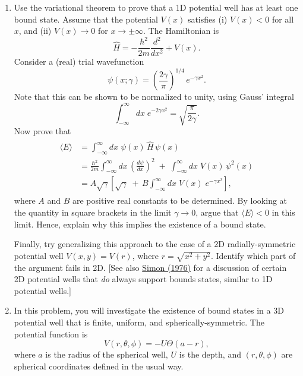 \documentclass[pra,12pt]{revtex4}
\begin{document}
\begin{enumerate}
\item Use the variational theorem to prove that a 1D potential well
  has at least one bound state.  Assume that the potential $V(x)$
  satisfies (i) $V(x) < 0$ for all $x$, and (ii) $V(x)\rightarrow 0$
  for $x\rightarrow\pm\infty$.  The Hamiltonian is
  \begin{equation}
    \hat{H} = - \frac{\hbar^2}{2m} \frac{d^2}{dx^2} + V(x).
  \end{equation}
  Consider a (real) trial wavefunction
  \begin{equation}
    \psi(x;\gamma) = \left(\frac{2\gamma}{\pi}\right)^{1/4} \,e^{-\gamma x^2}.
  \end{equation}
  Note that this can be shown to be normalized to unity, using Gauss'
  integral
  \begin{equation}
    \int_{-\infty}^{\infty} dx\; e^{-2\gamma x^2} = \sqrt{\frac{\pi}{2\gamma}}.
  \end{equation}
  Now prove that
  \begin{align}
    \begin{aligned}
      \langle E \rangle &= \int_{-\infty}^\infty dx \; \psi(x) \, \hat{H} \,\psi(x) \\
      &= \frac{\hbar^2}{2m} \int_{-\infty}^\infty dx\, \left(\frac{d\psi}{dx}\right)^2
      \;+\; \int_{-\infty}^\infty dx\; V(x) \,\psi^2(x) \\
      &= A\sqrt{\gamma} \left[\sqrt{\gamma}
        \;+\, B \int_{-\infty}^\infty dx\; V(x) \;e^{-\gamma x^2}
        \right],
    \end{aligned}
  \end{align}
  where $A$ and $B$ are positive real constants to be determined.  By
  looking at the quantity in square brackets in the limit $\gamma
  \rightarrow 0$, argue that $\langle E \rangle < 0$ in this limit.
  Hence, explain why this implies the existence of a bound state.

  Finally, try generalizing this approach to the case of a 2D
  radially-symmetric potential well $V(x,y) = V(r)$, where $r =
  \sqrt{x^2+y^2}$.  Identify which part of the argument fails in 2D.
       [See also \hyperref[cite:simon]{Simon (1976)} for a discussion
         of certain 2D potential wells that \textit{do} always support
         bounds states, similar to 1D potential wells.]
  \label{ex:boundstate}

\item In this problem, you will investigate the existence of bound
  states in a 3D potential well that is finite, uniform, and
  spherically-symmetric.  The potential function is
  \begin{equation}
    V(r,\theta,\phi) = -U\Theta(a-r),
  \end{equation}
  where $a$ is the radius of the spherical well, $U$ is the depth,
  and $(r,\theta,\phi)$ are spherical coordinates defined in the usual
  way.


\end{enumerate}
\end{document}
